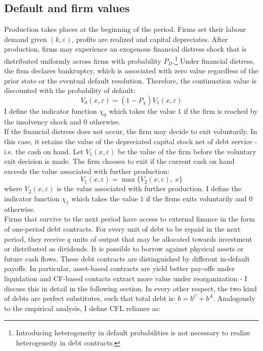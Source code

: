 \documentclass[12pt]{article}
\begin{document}
\subsection{Default and firm values \label{defaults}} 
Production takes places at the beginning of the period. Firms set their labour demand given $(k,\varepsilon)$, profits are realized and capital depreciates. After production, firms may experience an exogenous financial distress shock that is distributed uniformly across firms with probability $P_D$.\footnote{Introducing heterogeneity in default probabilities is not necessary to realize heterogeneity in debt contracts.} Under financial distress, the firm declares bankruptcy, which is associated with zero value regardless of the prior state or the eventual default resolution. Therefore, the continuation value is discounted with the probability of default: 
\begin{equation} \label{eq:V_0}
V_0(x,\varepsilon) = (1-P_\chi) V_1(x,\varepsilon)
\end{equation}
I define the indicator function $\chi_0$ which takes the value $1$ if the firm is reached by the insolvency shock and 0 otherwise. \vspace{3mm} \\
If the financial distress does not occur, the firm may decide to exit voluntarily. In this case, it retains the value of the depreciated capital stock net of debt service - i.e. the cash on hand. Let $V_1(x,\varepsilon)$ be the value of the firm before the voluntary exit decision is made. The firm chooses to exit if the current cash on hand exceeds the value associated with further production:
\begin{equation} \label{eq:V_1}
V_1(x,\varepsilon) = \max \Big\{ V_2(x,\varepsilon), \ x \Big\}
\end{equation} 
where $V_2(x,\varepsilon)$ is the value associated with further production. I define the indicator function $\chi_1$ which takes the value $1$ if the firms exits voluntarily and 0 otherwise. \vspace{3mm} \\
Firms that survive to the next period have access to external finance in the form of one-period debt contracts. For every unit of debt to be repaid in the next period, they receive $q$ units of output that may be allocated towards investment or distributed as dividends. It is possible to borrow against physical assets or future cash flows. These debt contracts are distinguished by different in-default payoffs. In particular, asset-based contracts are yield better pay-offs under liquidation and CF-based contacts extract more value under reorganization - I discuss this in detail in the following section. In every other respect, the two kind of debts are perfect substitutes, such that total debt is: $b = b^C+b^A$. Analogously to the empirical analysis, I define CFL reliance as: 
\end{document}

